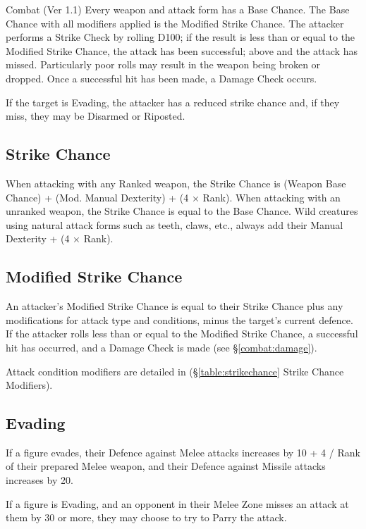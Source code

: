 \begin{Chapter}{Combat (Ver 1.1)}
Every weapon and attack form has a Base Chance.  The Base Chance with
all modifiers applied is the Modified Strike Chance.  The attacker
performs a Strike Check by rolling D100; if the result is less than or
equal to the Modified Strike Chance, the attack has been successful;
above and the attack has missed. Particularly poor rolls may result in
the weapon being broken or dropped. Once a successful hit has been
made, a Damage Check occurs.

If the target is Evading, the attacker has a reduced strike chance
and, if they miss, they may be Disarmed or Riposted.

\subsection{Strike Chance}

When attacking with any Ranked weapon, the Strike Chance is (Weapon
Base Chance) + (Mod.  Manual Dexterity) + (4 × Rank).  When attacking
with an unranked weapon, the Strike Chance is equal to the Base
Chance.  Wild creatures using natural attack forms such as teeth,
claws, etc., always add their Manual Dexterity + (4 × Rank).

\subsection{Modified Strike Chance}

An attacker’s Modified Strike Chance is equal to their Strike Chance
plus any modifications for attack type and conditions, minus the
target’s current defence. If the attacker rolls less than or equal to
the Modified Strike Chance, a successful hit has occurred, and a
Damage Check is made (see \S\ref{combat:damage}).

Attack condition modifiers are detailed in (\S\ref{table:strikechance}
Strike Chance Modifiers).

\subsection{Evading}

If a figure evades, their Defence against Melee attacks increases by
10 + 4 / Rank of their prepared Melee weapon, and their Defence
against Missile attacks increases by 20.

If a figure is Evading, and an opponent in their Melee Zone misses an
attack at them by 30 or more, they may choose to try to Parry the
attack.


\end{Chapter}
